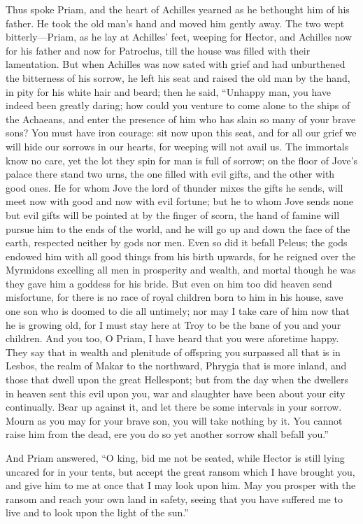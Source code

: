 Thus spoke Priam, and the heart of Achilles yearned as he bethought him of
his father. He took the old man’s hand and moved him gently away. The two
wept bitterly—Priam, as he lay at Achilles’ feet, weeping for
Hector, and Achilles now for his father and now for Patroclus, till the
house was filled with their lamentation. But when Achilles was now sated
with grief and had unburthened the bitterness of his sorrow, he left his
seat and raised the old man by the hand, in pity for his white hair and
beard; then he said, “Unhappy man, you have indeed been greatly daring;
how could you venture to come alone to the ships of the Achaeans, and
enter the presence of him who has slain so many of your brave sons? You
must have iron courage: sit now upon this seat, and for all our grief we
will hide our sorrows in our hearts, for weeping will not avail us. The
immortals know no care, yet the lot they spin for man is full of sorrow;
on the floor of Jove’s palace there stand two urns, the one filled with
evil gifts, and the other with good ones. He for whom Jove the lord of
thunder mixes the gifts he sends, will meet now with good and now with
evil fortune; but he to whom Jove sends none but evil gifts will be
pointed at by the finger of scorn, the hand of famine will pursue him to
the ends of the world, and he will go up and down the face of the earth,
respected neither by gods nor men. Even so did it befall Peleus; the gods
endowed him with all good things from his birth upwards, for he reigned
over the Myrmidons excelling all men in prosperity and wealth, and mortal
though he was they gave him a goddess for his bride. But even on him too
did heaven send misfortune, for there is no race of royal children born to
him in his house, save one son who is doomed to die all untimely; nor may
I take care of him now that he is growing old, for I must stay here at
Troy to be the bane of you and your children. And you too, O Priam, I have
heard that you were aforetime happy. They say that in wealth and plenitude
of offspring you surpassed all that is in Lesbos, the realm of Makar to
the northward, Phrygia that is more inland, and those that dwell upon the
great Hellespont; but from the day when the dwellers in heaven sent this
evil upon you, war and slaughter have been about your city continually.
Bear up against it, and let there be some intervals in your sorrow. Mourn
as you may for your brave son, you will take nothing by it. You cannot
raise him from the dead, ere you do so yet another sorrow shall befall
you.”

And Priam answered, “O king, bid me not be seated, while Hector is still
lying uncared for in your tents, but accept the great ransom which I have
brought you, and give him to me at once that I may look upon him. May you
prosper with the ransom and reach your own land in safety, seeing that you
have suffered me to live and to look upon the light of the sun.”

